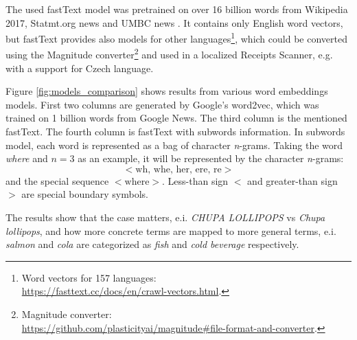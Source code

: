 \documentclass[
  digital, %
  table,   %
  oneside, %
  lof,     %
  lot,     %
]{fithesis3}
\begin{document}
The used fastText model was pretrained on over 16 billion words from Wikipedia 2017, Statmt.org news and UMBC news \cite{Mikolov2018Advances}. It contains only English word vectors, but fastText provides also models for other languages\footnote{Word vectors for 157 languages:\\ \url{https://fasttext.cc/docs/en/crawl-vectors.html}.}, which could be converted using the Magnitude converter\footnote{Magnitude converter:\\ \url{https://github.com/plasticityai/magnitude\#file-format-and-converter}.} and used in a localized Receipts Scanner, e.g. with a support for Czech language.

Figure \ref{fig:models_comparison} shows results from various word embeddings models. First two columns are generated by Google's word2vec, which was trained on 1 billion words from Google News. The third column is the mentioned fastText. The fourth column is fastText with subwords information. In subwords model, each word is represented as a bag of character \textit{n}-grams. Taking the
word \textit{where} and $n = 3$ as an example, it will be
represented by the character \textit{n}-grams:
\[
<\text{wh, whe, her, ere, re}>
\]
and the special sequence $<\text{where}>$. Less-than sign $<$ and greater-than sign $>$ are special boundary symbols. \cite{BojanowskiEtal2017Enriching}

The results show that the case matters, e.i. \textit{CHUPA LOLLIPOPS} vs \textit{Chupa lollipops}, and how more concrete terms are mapped to more general terms, e.i. \textit{salmon} and \textit{cola} are categorized as \textit{fish} and \textit{cold beverage} respectively.
\end{document}
